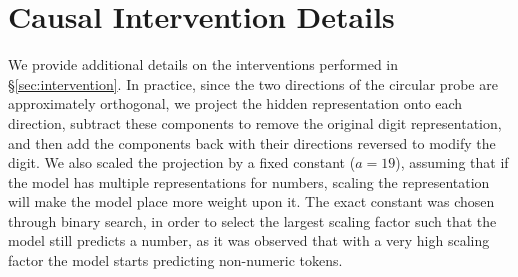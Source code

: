 \documentclass[11pt]{article}
\begin{document}
\section{Causal Intervention Details}
\label{apx:causaldetails}

We provide additional details on the interventions performed in \S\ref{sec:intervention}.
In practice, since the two directions of the circular probe are approximately orthogonal, we project the hidden representation onto each direction, subtract these components to remove the original digit representation, and then add the components back with their directions reversed to modify the digit. We also scaled the projection by a fixed constant ($a=19$), assuming that if the model has multiple representations for numbers, scaling the representation will make the model place more weight upon it. The exact constant was chosen through binary search, in order to select the largest scaling factor such that the model still predicts a number, as it was observed that with a very high scaling factor the model starts predicting non-numeric tokens.
\end{document}
